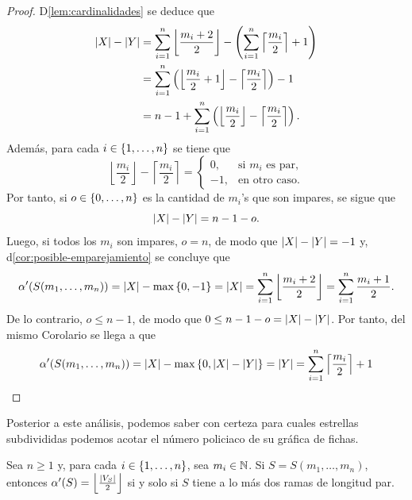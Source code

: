 \begin{proof}
    D\cref{lem:cardinalidades} se deduce que
    \begin{align*}
        \left|X\right|-\left|Y\right| &= 
                        \sum_{i=1}^{n} \left\lfloor\frac{m_i + 2}{2}
                        \right\rfloor - \left( \sum_{i=1}^{n} \left\lceil
                        \frac{m_i}{2}\right\rceil + 1\right) \\
                        &= \sum_{i=1}^{n}\left( \left\lfloor \frac{m_i}{2} 
                        + 1 \right\rfloor - \left\lceil \frac{m_i}{2} \right
                        \rceil\right) - 1 \\
                        &= n - 1 + \sum_{i=1}^{n}\left( \left\lfloor\frac{m_i}
                        {2}\right\rfloor - \left\lceil \frac{m_i}{2} \right
                        \rceil\right).
    \end{align*}
    Adem\'as, para cada $i\in\{1,\dots, n\}$ se tiene que
    \[
        \left\lfloor \frac{m_i}{2} \right\rfloor - 
        \left\lceil \frac{m_i}{2} \right\rceil = \begin{cases}
        0, & \text{si } m_i \text{ es par,} \\
        -1, & \text{en otro caso.}
        \end{cases}
    \]
    Por tanto, si $o\in\{0,\dots, n\}$ es la cantidad de $m_i$'s que son impares, se
    sigue que
    \[
        \left|X\right| - \left|Y\right| = n - 1 - o.
    \]
    Luego, si todos los $m_i$ son impares, $o=n$, de modo que $\left|X\right| - \left|Y\right|
    = -1$ y, d\cref{cor:posible-emparejamiento} se concluye que
    \[
        \alpha'(S(m_1,\dots,m_n)) = \left|X\right| - \max\left\{ 0,-1\right\} = \left|X\right| = 
        \sum_{i=1}^{n} \left\lfloor\frac{m_i + 2}{2}\right\rfloor = \sum_{i=1}^{n}
        \frac{m_i + 1}{2}.
    \]
    De lo contrario, $o\leq n-1$, de modo que $0\leq n-1-o = \left|X\right| - \left|Y\right|$.
    Por tanto, del mismo Corolario se llega a que
    \[
        \alpha'(S(m_1,\dots,m_n)) = \left|X\right| - \max\left\{ 0,\left|X\right|-\left|Y\right|\right\} = \left|Y\right|
        = \sum_{i=1}^{n} \left\lceil\frac{m_i}{2}\right\rceil + 1
    \]
\end{proof}

Posterior a este an\'alisis, podemos saber con certeza para cuales estrellas
subdivididas podemos acotar el n\'umero policiaco de su gr\'afica de fichas.

\begin{lema}
\label{lem:todo-acotado}
    Sea $n\geq 1$ y, para cada $i\in\{1,\dots, n\}$, sea $m_i\in\mathbb{N}$. Si
    $S=S(m_1,\dots,m_n)$, entonces $\alpha'(S) =
    \left\lfloor\frac{\left|V_S\right|}{2}\right\rfloor$ si y solo si $S$ tiene a lo
    m\'as dos ramas de longitud par.
\end{lema}

